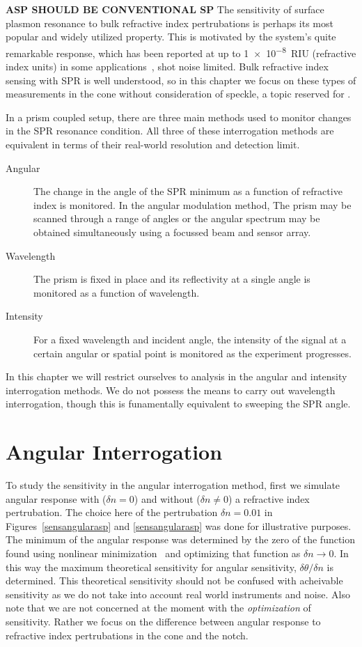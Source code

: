 \textbf{ASP SHOULD BE CONVENTIONAL SP}
The sensitivity of surface plasmon resonance to bulk refractive index
pertrubations is perhaps its most popular and widely utilized property.
This is motivated by the system's quite remarkable response, which has been
reported at up to \SI{1e-8}{RIU} (refractive index units) in some
applications~\cite{sprreview}, shot noise limited.  Bulk refractive index
sensing with SPR is well understood, so in this chapter we focus on these
types of measurements in the cone without consideration of speckle, a topic
reserved for .  

In a prism coupled setup, there are three main methods used to
monitor changes in the SPR resonance condition.  All three of these
interrogation methods are equivalent in terms of their real-world
resolution and detection limit.~\cite{pines1952collective}
\begin{description}
	\item [{Angular}] The change in the angle of the SPR minimum as a function
					of refractive index is monitored.  In the angular modulation method,
					The prism may be scanned through a range of angles or the angular
					spectrum may be obtained simultaneously using a focussed beam and
					sensor array.
 \item [{Wavelength}] The prism is fixed in place and its reflectivity at
  a single angle is monitored as a function of wavelength.
	\item [{Intensity}] For a fixed wavelength and incident angle, the
		intensity of the signal at a certain angular or spatial point is
		monitored as the experiment progresses.
\end{description}

In this chapter we will restrict ourselves to analysis in the angular and
intensity interrogation methods.  We do not possess the means to carry out
wavelength interrogation, though this is funamentally equivalent to
sweeping the SPR angle. 

\section{Angular Interrogation}
To study the sensitivity in the angular interrogation method, first we
simulate angular response with ($\delta n = 0$) and without ($\delta n \ne
0$) a refractive index pertrubation.  The choice here of the pertrubation
$\delta n = 0.01$ in Figures~\ref{sensangularasp} and \ref{sensangularasp}
was done for illustrative purposes.  The minimum of the angular response
was determined by the zero of the function found using nonlinear
minimization~\cite{fminbnd} and optimizing that function as $\delta n \to
0$.  In this way the maximum theoretical sensitivity for angular
sensitivity, $\delta \theta/\delta n$ is determined.  This theoretical
sensitivity should not be confused with acheivable sensitivity as we do not
take into account real world instruments and noise.  Also note that we are
not concerned at the moment with the \textit{optimization} of sensitivity.
Rather we focus on the difference between angular response to refractive
index pertrubations in the cone and the notch.  

